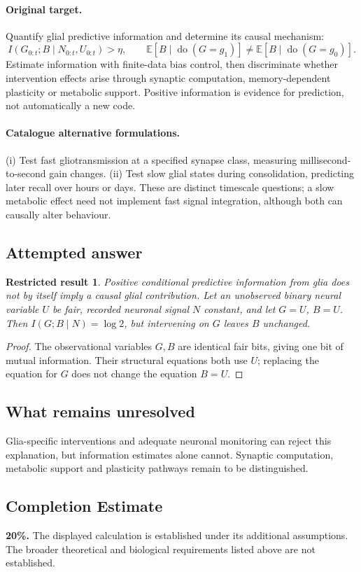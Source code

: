 \documentclass[11pt]{article}
\newcommand{\E}{\mathbb E}
\providecommand{\E}{\mathbb E}
\newtheorem{attemptresult}{Restricted result}[section]
\begin{document}
\paragraph{Original target.}
Quantify glial predictive information and determine its causal mechanism:
\[
I(G_{0:t};B\mid N_{0:t},U_{0:t})>\eta,
\qquad
\E[B\mid\operatorname{do}(G=g_1)]\neq\E[B\mid\operatorname{do}(G=g_0)].
\]
Estimate information with finite-data bias control, then discriminate whether intervention effects arise through synaptic computation, memory-dependent plasticity or metabolic support. Positive information is evidence for prediction, not automatically a new code.
\paragraph{Catalogue alternative formulations.}
(i) Test fast gliotransmission at a specified synapse class, measuring millisecond-to-second gain changes. (ii) Test slow glial states during consolidation, predicting later recall over hours or days. These are distinct timescale questions; a slow metabolic effect need not implement fast signal integration, although both can causally alter behaviour.
\subsection{Attempted answer}
\begin{attemptresult}
Positive conditional predictive information from glia does not by itself imply a causal glial contribution. Let an unobserved binary neural variable $U$ be fair, recorded neuronal signal $N$ constant, and let $G=U$, $B=U$. Then $I(G;B\mid N)=\log2$, but intervening on $G$ leaves $B$ unchanged.
\end{attemptresult}
\begin{proof}
The observational variables $G,B$ are identical fair bits, giving one bit of mutual information. Their structural equations both use $U$; replacing the equation for $G$ does not change the equation $B=U$.
\end{proof}
\subsection{What remains unresolved}
Glia-specific interventions and adequate neuronal monitoring can reject this explanation, but information estimates alone cannot. Synaptic computation, metabolic support and plasticity pathways remain to be distinguished.
\subsection{Completion Estimate}
\textbf{20\%.} The displayed calculation is established under its additional assumptions. The broader theoretical and biological requirements listed above are not established.
\end{document}
